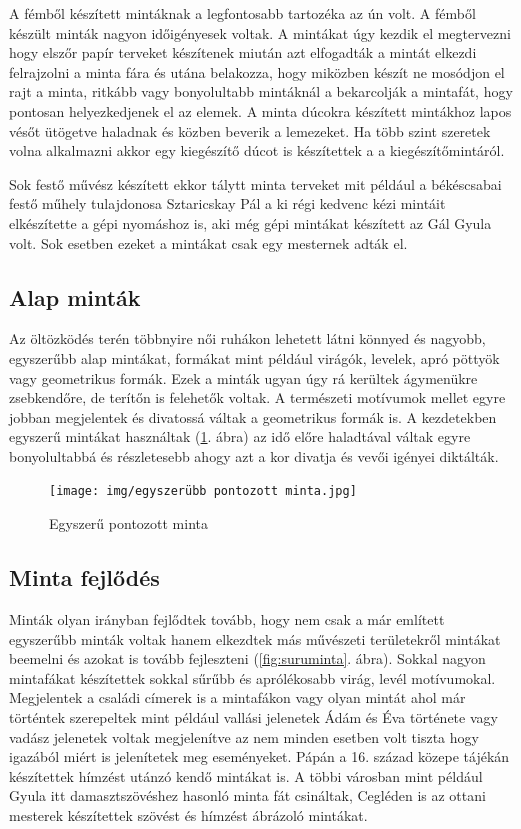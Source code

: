 \documentclass[fontsize=12pt, appendixprefix=true]{scrreprt}
\begin{document}
A fémből készített mintáknak a legfontosabb tartozéka az ún volt. A fémből készült minták nagyon időigényesek voltak. A mintákat úgy kezdik el megtervezni hogy elszőr papír terveket készítenek miután azt elfogadták a mintát elkezdi felrajzolni a minta fára és utána belakozza, hogy miközben készít ne mosódjon el rajt a minta, ritkább vagy bonyolultabb mintáknál a bekarcolják a mintafát, hogy pontosan helyezkedjenek el az elemek.
A minta dúcokra készített mintákhoz lapos vésőt ütögetve haladnak és közben beverik a lemezeket. Ha több szint szeretek volna alkalmazni akkor egy kiegészítő dúcot is készítettek a a kiegészítőmintáról.

Sok festő művész készített ekkor tálytt minta terveket mit például a békéscsabai festő műhely tulajdonosa Sztaricskay Pál a ki régi kedvenc kézi mintáit elkészítette a gépi nyomáshoz is, aki még  gépi mintákat készített az Gál Gyula volt. Sok esetben ezeket a mintákat csak egy mesternek adták el.

\subsection{Alap minták}
Az öltözködés terén többnyire női ruhákon lehetett látni könnyed és nagyobb, egyszerűbb alap mintákat, formákat mint például virágók, levelek, apró pöttyök vagy geometrikus formák.
Ezek a minták ugyan úgy rá kerültek ágymenükre zsebkendőre, de terítőn is felehetők voltak.
A természeti motívumok mellet egyre jobban megjelentek és divatossá váltak a geometrikus formák is.
A kezdetekben egyszerű mintákat használtak (\ref{fig:egyszeruminta}. ábra) az idő előre haladtával váltak egyre bonyolultabbá és részletesebb ahogy azt a kor divatja és vevői igényei diktálták.

\begin{figure}[h!]
	\centering
	\texttt{[image: img/egyszerübb pontozott minta.jpg]}
	\caption{Egyszerű pontozott minta}
	\label{fig:egyszeruminta}
\end{figure}

\subsection{Minta fejlődés}
Minták olyan irányban fejlődtek tovább, hogy nem csak a már említett egyszerűbb minták voltak hanem  elkezdtek más művészeti területekről mintákat beemelni és azokat is tovább fejleszteni (\ref{fig:suruminta}. ábra).
Sokkal nagyon mintafákat készítettek sokkal sűrűbb és aprólékosabb virág, levél motívumokal. Megjelentek a családi címerek is a mintafákon vagy olyan mintát ahol már történtek szerepeltek mint például vallási jelenetek Ádám és Éva története vagy vadász jelenetek voltak megjelenítve az nem minden esetben volt tiszta hogy igazából miért is jelenítetek meg eseményeket. Pápán a 16. század közepe tájékán  készítettek hímzést utánzó kendő mintákat is. A többi városban mint például Gyula itt damasztszövéshez hasonló minta fát csináltak, Cegléden is az ottani mesterek készítettek szövést és hímzést ábrázoló mintákat.
\end{document}
